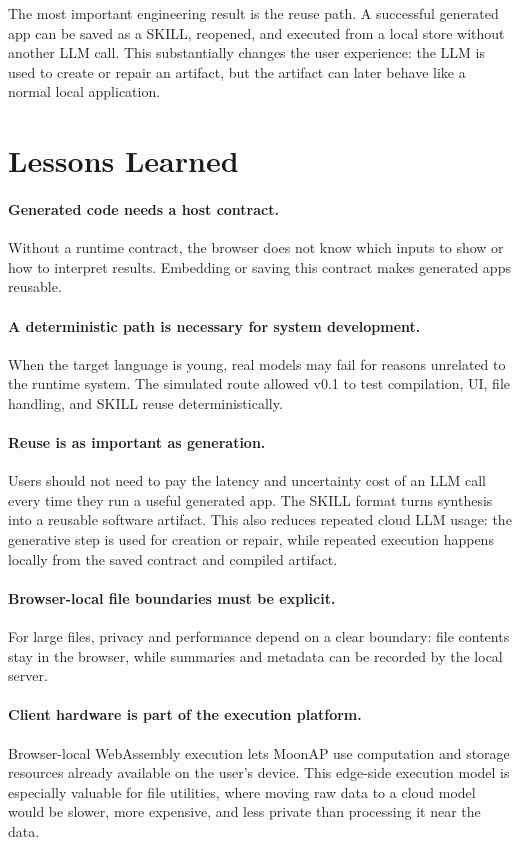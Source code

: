 \documentclass[11pt]{article}
\newcommand{\moonap}{MoonAP}
\newcommand{\skill}{SKILL}
\newcommand{\wasm}{WebAssembly}
\begin{document}
The most important engineering result is the reuse path. A successful generated app can be saved as a \skill{}, reopened, and executed from a local store without another LLM call. This substantially changes the user experience: the LLM is used to create or repair an artifact, but the artifact can later behave like a normal local application.

\section{Lessons Learned}

\paragraph{Generated code needs a host contract.}
Without a runtime contract, the browser does not know which inputs to show or how to interpret results. Embedding or saving this contract makes generated apps reusable.

\paragraph{A deterministic path is necessary for system development.}
When the target language is young, real models may fail for reasons unrelated to the runtime system. The simulated route allowed v0.1 to test compilation, UI, file handling, and \skill{} reuse deterministically.

\paragraph{Reuse is as important as generation.}
Users should not need to pay the latency and uncertainty cost of an LLM call every time they run a useful generated app. The \skill{} format turns synthesis into a reusable software artifact. This also reduces repeated cloud LLM usage: the generative step is used for creation or repair, while repeated execution happens locally from the saved contract and compiled artifact.

\paragraph{Browser-local file boundaries must be explicit.}
For large files, privacy and performance depend on a clear boundary: file contents stay in the browser, while summaries and metadata can be recorded by the local server.

\paragraph{Client hardware is part of the execution platform.}
Browser-local \wasm{} execution lets \moonap{} use computation and storage resources already available on the user's device. This edge-side execution model is especially valuable for file utilities, where moving raw data to a cloud model would be slower, more expensive, and less private than processing it near the data.
\end{document}
